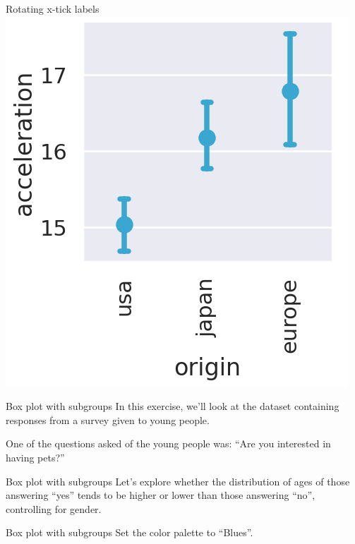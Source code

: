 \documentclass[
  ignorenonframetext,
]{beamer}
\begin{document}
\begin{frame}{Rotating x-tick labels}
\label{rotating-x-tick-labels-5}
\includegraphics{../images/im308.png}
\end{frame}

\begin{frame}{Box plot with subgroups}
\label{box-plot-with-subgroups}
In this exercise, we'll look at the dataset containing responses from a
survey given to young people.

One of the questions asked of the young people was: ``Are you interested
in having pets?''
\end{frame}

\begin{frame}{Box plot with subgroups}
\label{box-plot-with-subgroups-1}
Let's explore whether the distribution of ages of those answering
``yes'' tends to be higher or lower than those answering ``no'',
controlling for gender.
\end{frame}

\begin{frame}{Box plot with subgroups}
\label{box-plot-with-subgroups-2}
Set the color palette to ``Blues''.
\end{frame}
\end{document}
